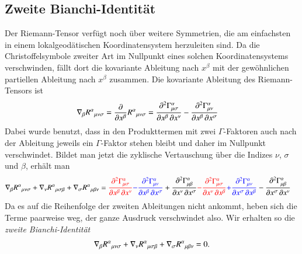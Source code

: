 \subsection{Zweite Bianchi-Identität}
Der Riemann-Tensor verfügt noch über weitere Symmetrien, die am
einfachsten in einem lokalgeodätischen Koordinatensystem herzuleiten sind. 
Da die Christoffelsymbole zweiter Art im Nullpunkt eines solchen
Koordinatensystems verschwinden, fällt dort die kovariante Ableitung
nach $x^\beta$ mit der gewöhnlichen partiellen Ableitung nach $x^\beta$
zusammen.
Die kovariante Ableitung des Riemann-Tensors ist
\begin{align*}
\nabla_\beta
R^\alpha\mathstrut_{\mu\nu\sigma}
&=
\frac{\partial}{\partial x^\beta}
R^\alpha\mathstrut_{\mu\nu\sigma}
=
\frac{\partial^2\Gamma^\alpha_{\mu\sigma}}{\partial x^\beta\,\partial x^\nu}
-
\frac{\partial^2\Gamma^\alpha_{\mu\nu}}{\partial x^\beta\,\partial x^\sigma}
\end{align*}
Dabei wurde benutzt, dass in den Produkttermen mit zwei $\Gamma$-Faktoren
auch nach der Ableitung jeweils ein $\Gamma$-Faktor stehen bleibt und 
daher im Nullpunkt verschwindet.
Bildet man jetzt die zyklische Vertauschung über die Indizes $\nu$,
$\sigma$ und $\beta$, erhält man
\begin{align*}
\nabla_\beta R^\alpha\mathstrut_{\mu\nu\sigma}
+
\nabla_\nu R^\alpha\mathstrut_{\mu\sigma\beta}
+
\nabla_\sigma R^\alpha\mathstrut_{\mu\beta\nu}
&=
{\color{red}
\frac{\partial^2\Gamma^\alpha_{\mu\sigma}}{\partial x^\beta\,\partial x^\nu}
}
{\color{blue}
-
\frac{\partial^2\Gamma^\alpha_{\mu\nu}}{\partial x^\beta\,\partial x^\sigma}
}
%
+
%
\frac{\partial^2\Gamma^\alpha_{\mu\beta}}{\partial x^\nu\,\partial x^\sigma}
{\color{red}
-
\frac{\partial^2\Gamma^\alpha_{\mu\sigma}}{\partial x^\nu\,\partial x^\beta}
}
%
{\color{blue}
+
%
\frac{\partial^2\Gamma^\alpha_{\mu\nu}}{\partial x^\sigma\,\partial x^\beta}
}
-
\frac{\partial^2\Gamma^\alpha_{\mu\beta}}{\partial x^\sigma\,\partial x^\nu}
\end{align*}
Da es auf die Reihenfolge der zweiten Ableitungen nicht ankommt, heben
sich die Terme paarweise weg, der ganze Ausdruck verschwindet also.
Wir erhalten so die {\em zweite Bianchi-Identität}
\begin{equation}
\nabla_\beta R^\alpha\mathstrut_{\mu\nu\sigma}
+
\nabla_\nu R^\alpha\mathstrut_{\mu\sigma\beta}
+
\nabla_\sigma R^\alpha\mathstrut_{\mu\beta\nu}
=0.
\label{skript:kruemmung:bianchi2}
\end{equation}
%


